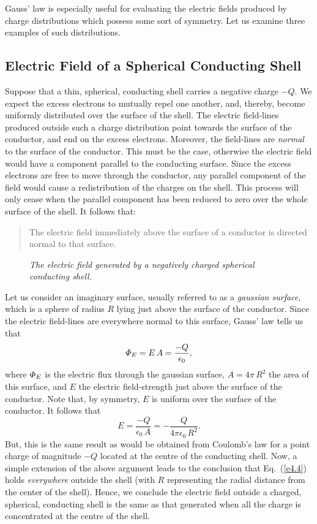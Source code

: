 Gauss' law is especially useful for  evaluating the electric fields
produced by charge distributions which possess some sort
of symmetry. Let us examine three 
examples of such distributions.

\subsection{Electric Field of a Spherical Conducting Shell}\label{snormal}
Suppose that a thin, spherical, conducting shell carries a negative charge $-Q$. We expect the
excess electrons to mutually repel one another, and, thereby, become uniformly distributed
over the surface of the shell. The electric field-lines produced outside such a
charge distribution point towards the surface of the conductor, and end on the
excess electrons. Moreover, the field-lines are {\em normal}\/ to the surface of the conductor.
This must be the case, otherwise the electric field would have a component parallel
to the conducting surface. Since the excess electrons are free to move through the conductor,
any parallel component of the field would cause a redistribution of the charges 
on the shell. This process will only cease when the parallel component 
 has been reduced to zero over the whole surface of the shell. It follows that:
\begin{quote}
{\sf The electric field immediately above the surface of a conductor is directed
normal to that surface}.
\end{quote}

\begin{figure}[h]
\epsfysize=3.5in
\centerline{}
\caption{\em The electric field generated by a negatively charged spherical
conducting shell.}\label{f4.2}
\end{figure}

Let us consider an imaginary surface, usually referred to as a {\em gaussian surface},
which is a sphere of radius $R$ lying just above the surface of
the conductor. Since the electric field-lines are everywhere normal
to this surface, Gauss' law tells us that
\begin{equation}
{\mit\Phi}_E = E\,A = \frac{-Q}{\epsilon_0},
\end{equation}
where ${\mit\Phi}_E$ is the electric flux through the gaussian surface, 
$A=4\pi\, R^2$ the area of this surface, and $E$ the electric
field-strength just above the surface of the conductor. Note that, by symmetry, 
 $E$ is
uniform over the surface of the conductor. It follows that
\begin{equation}\label{e4.4}
E = \frac{-Q}{\epsilon_0\,A} =- \frac{Q}{4\pi\epsilon_0\,R^2}.
\end{equation}
But, this is  the same result as would be obtained from Coulomb's law for 
a point charge of magnitude $-Q$ located at the centre of the conducting
shell. Now, a simple extension of the above argument leads to the conclusion that
Eq.~(\ref{e4.4}) holds {\em everywhere}\/ outside the shell (with $R$ representing
the radial distance from the center of the shell).
Hence, we conclude the electric field outside a charged, spherical, conducting shell is the same as that generated when all the charge is concentrated at the centre of the shell.

